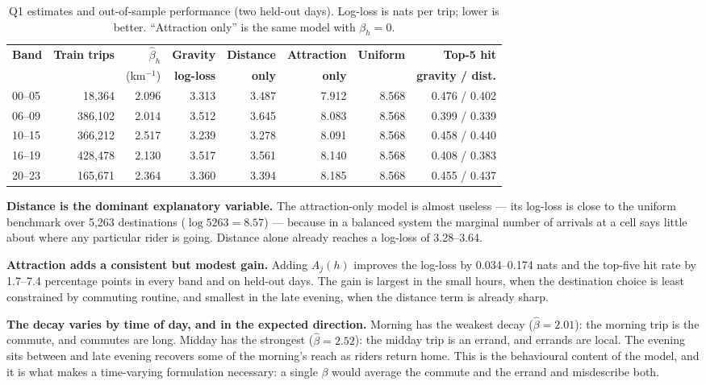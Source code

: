 \begin{table}[htbp]
\centering
\footnotesize
\caption[Q1 estimates and held-out performance]{Q1 estimates and out-of-sample performance (two held-out days). Log-loss is
nats per trip; lower is better. ``Attraction only'' is the same model with
$\beta_h=0$.}
\label{tab:q1}
\scriptsize
\begin{tabular}{@{}lrrrrrrr@{}}
\toprule
\textbf{Band} & \textbf{Train trips} & $\hat\beta_h$ & \textbf{Gravity} &
\textbf{Distance} & \textbf{Attraction} & \textbf{Uniform} & \textbf{Top-5 hit} \\
 & & (km$^{-1}$) & \textbf{log-loss} & \textbf{only} & \textbf{only} & & \textbf{gravity / dist.} \\
\midrule
00--05 & 18,364 & 2.096 & 3.313 & 3.487 & 7.912 & 8.568 & 0.476 / 0.402 \\
06--09 & 386,102 & 2.014 & 3.512 & 3.645 & 8.083 & 8.568 & 0.399 / 0.339 \\
10--15 & 366,212 & 2.517 & 3.239 & 3.278 & 8.091 & 8.568 & 0.458 / 0.440 \\
16--19 & 428,478 & 2.130 & 3.517 & 3.561 & 8.140 & 8.568 & 0.408 / 0.383 \\
20--23 & 165,671 & 2.364 & 3.360 & 3.394 & 8.185 & 8.568 & 0.455 / 0.437 \\
\bottomrule
\end{tabular}
\end{table}

\textbf{Distance is the dominant explanatory variable.} The attraction-only model is
almost useless --- its log-loss is close to the uniform benchmark over 5,263
destinations ($\log 5263=8.57$) --- because in a balanced system the marginal number of
arrivals at a cell says little about where any particular rider is going. Distance
alone already reaches a log-loss of 3.28--3.64.

\textbf{Attraction adds a consistent but modest gain.} Adding $A_j(h)$ improves the
log-loss by 0.034--0.174 nats and the top-five hit rate by 1.7--7.4 percentage points
in every band and on held-out days. The gain is largest in the small hours, when the
destination choice is least constrained by commuting routine, and smallest in the late
evening, when the distance term is already sharp.

\textbf{The decay varies by time of day, and in the expected direction.} Morning has
the weakest decay ($\hat\beta=2.01$): the morning trip is the commute, and commutes are
long. Midday has the strongest ($\hat\beta=2.52$): the midday trip is an errand, and
errands are local. The evening sits between and late evening recovers some of the
morning's reach as riders return home. This is the behavioural content of the model,
and it is what makes a time-varying formulation necessary: a single $\beta$ would
average the commute and the errand and misdescribe both.

